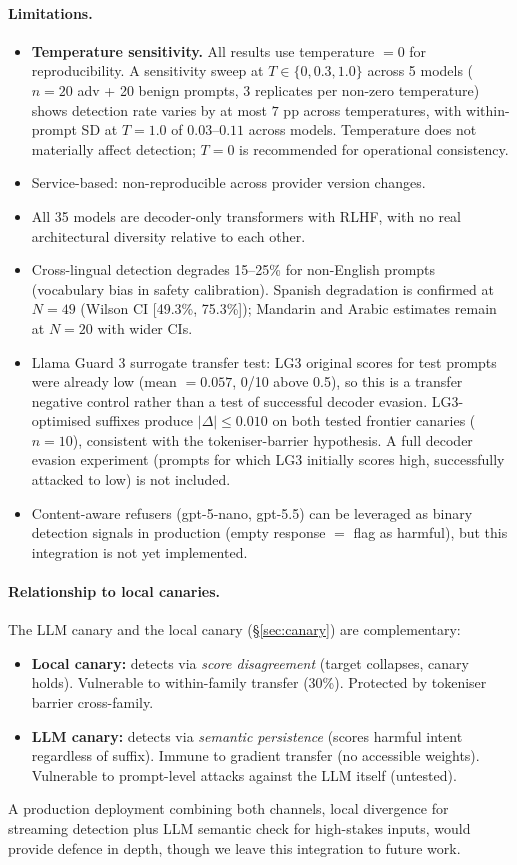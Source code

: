 \paragraph{Limitations.}
\begin{itemize}
\item \textbf{Temperature sensitivity.} All results use temperature $= 0$ for reproducibility. A sensitivity sweep at $T \in \{0, 0.3, 1.0\}$ across 5 models ($n = 20$ adv + 20 benign prompts, 3 replicates per non-zero temperature) shows detection rate varies by at most $7$ pp across temperatures, with within-prompt SD at $T = 1.0$ of $0.03$--$0.11$ across models. Temperature does not materially affect detection; $T = 0$ is recommended for operational consistency.
\item Service-based: non-reproducible across provider version changes.
\item All 35 models are decoder-only transformers with RLHF, with no real architectural diversity relative to each other.
\item Cross-lingual detection degrades 15--25\% for non-English prompts (vocabulary bias in safety calibration). Spanish degradation is confirmed at $N = 49$ (Wilson CI [49.3\%, 75.3\%]); Mandarin and Arabic estimates remain at $N = 20$ with wider CIs.
\item Llama Guard 3 surrogate transfer test: LG3 original scores for test prompts were already low (mean $= 0.057$, 0/10 above 0.5), so this is a transfer negative control rather than a test of successful decoder evasion. LG3-optimised suffixes produce $|\Delta| \leq 0.010$ on both tested frontier canaries ($n = 10$), consistent with the tokeniser-barrier hypothesis. A full decoder evasion experiment (prompts for which LG3 initially scores high, successfully attacked to low) is not included.
\item Content-aware refusers (gpt-5-nano, gpt-5.5) can be leveraged as binary detection signals in production (empty response $=$ flag as harmful), but this integration is not yet implemented.
\end{itemize}

\paragraph{Relationship to local canaries.} The LLM canary and the local canary (\S\ref{sec:canary}) are complementary:
\begin{itemize}
\item \textbf{Local canary:} detects via \emph{score disagreement} (target collapses, canary holds). Vulnerable to within-family transfer (30\%). Protected by tokeniser barrier cross-family.
\item \textbf{LLM canary:} detects via \emph{semantic persistence} (scores harmful intent regardless of suffix). Immune to gradient transfer (no accessible weights). Vulnerable to prompt-level attacks against the LLM itself (untested).
\end{itemize}
A production deployment combining both channels, local divergence for streaming detection plus LLM semantic check for high-stakes inputs, would provide defence in depth, though we leave this integration to future work.
